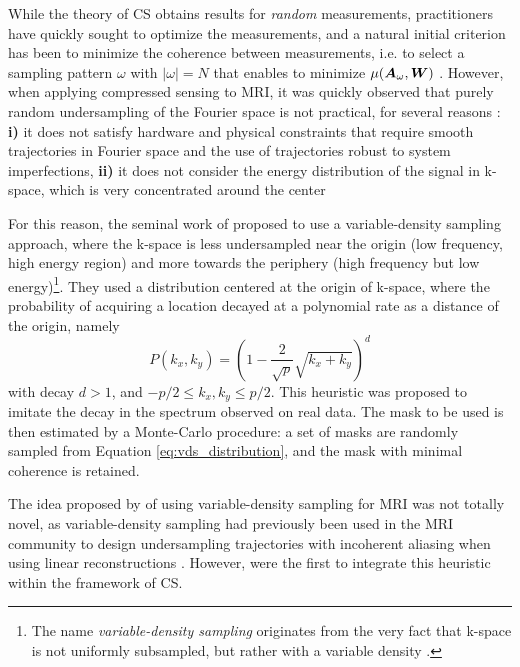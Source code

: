 While the theory of CS obtains results for \textit{random} measurements, practitioners have quickly sought to optimize the measurements, and a natural initial criterion has been to minimize the coherence between measurements, i.e. to select a sampling pattern $\omega$ with $|\omega| = N$ that enables to minimize $\mu({\bm{A}}_\omega, {\bm{W}})$ \citep{lustig2007sparse}. However, when applying compressed sensing to MRI, it was quickly observed that purely random undersampling of the Fourier space is not practical, for several reasons \citep{lustig2007sparse,lustig2008compressed}: \textbf{i)} it does not satisfy hardware and physical constraints that require smooth trajectories in Fourier space and the use of trajectories robust to system imperfections, \textbf{ii)} it does not consider the energy distribution of the signal in k-space, which is very concentrated around the center %

For this reason, the seminal work of \citet{lustig2007sparse} proposed to use a variable-density sampling approach, where the k-space is less undersampled near the origin (low frequency, high energy region) and more towards the periphery (high frequency but low energy)\footnote{The name \textit{variable-density sampling} originates from the very fact that k-space is not uniformly subsampled, but rather with a variable density \citep{tsai2000reduced}.}.  They used a distribution centered at the origin of k-space, where the probability of acquiring a location decayed at a polynomial rate as a distance of the origin, namely 
\begin{equation}
    P(k_x,k_y) = \left(1-\frac{2}{\sqrt{p}}\sqrt{k_x+k_y}\right)^d \label{eq:vds_distribution}
\end{equation}
with decay $d>1$, and $-p/2\leq k_x,k_y\leq p/2$. This heuristic was proposed to imitate the decay in the spectrum observed on real data. The mask to be used is then estimated by a Monte-Carlo procedure: a set of masks are randomly sampled from Equation \ref{eq:vds_distribution}, and the mask with minimal coherence is retained.


The idea proposed by \citet{lustig2007sparse} of using variable-density sampling for MRI was not totally novel, as variable-density sampling had previously been used in the MRI community to design undersampling trajectories with incoherent aliasing when using linear reconstructions \citep{marseille1996nonuniform,tsai2000reduced}. However, \citet{lustig2007sparse} were the first to integrate this heuristic within the framework of CS. 

